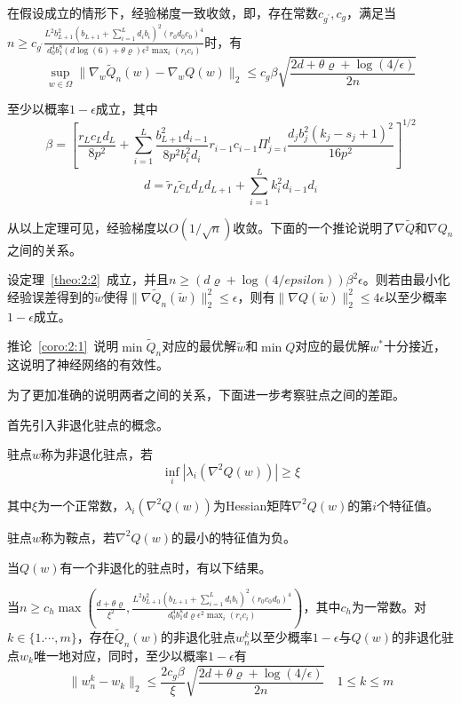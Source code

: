 \begin{theorem}\label{theo:2:2}
在假设成立的情形下，经验梯度一致收敛，即，存在常数$c_{g^\prime}, c_g$，满足当$n \geq c_{g^\prime}\frac{L^2 b_{L+1}^2(b_{L+1}+\sum_{i=1}^Ld_ib_i)^2(r_0d_0c_0)^4}{d_0^4b_1^8(d\log(6)+\theta\varrho)\epsilon^2\max_i(r_ic_i)}$时，有
\[
\sup_{w\in \Omega} \|\nabla_w \tilde{Q}_n(w)-\nabla_wQ(w)\|_2\leq c_g \beta \sqrt{\frac{2d+\theta\varrho+\log(4/\epsilon)}{2n}}
\]
\par
至少以概率$1-\epsilon$成立，其中
\[
\beta = [\frac{r_Lc_Ld_L}{8p^2}+\sum_{i=1}^L\frac{b_{L+1}^2d_{i-1}}{8p^2b_i^2d_i}r_{i-1}c_{i-1}\Pi_{j=i}^l\frac{d_jb_j^2(k_j-s_j+1)^2}{16p^2}]^{1/2}
\]
\[
d = \tilde{r}_L\tilde{c}_L d_Ld_{L+1}+\sum_{i=1}^L k_i^2d_{i-1}d_i
\]
\end{theorem}
\par
从以上定理可见，经验梯度以$O(1/\sqrt{n})$收敛。下面的一个推论说明了$\nabla \tilde{Q}$和$\nabla Q_n$之间的关系。
\begin{corollary}\label{coro:2:1}
设定理~\ref{theo:2:2}~成立，并且$n \geq (d\varrho +\log(4/epsilon))\beta^2\epsilon$。则若由最小化经验误差得到的$\tilde{w}$使得$\|\nabla \tilde{Q}_n(\tilde{w})\|_2^2 \leq \epsilon$，则有$\|\nabla Q(\tilde{w})\|_2^2 \leq 4\epsilon$以至少概率$1-\epsilon$成立。
\end{corollary}
\par
推论~\ref{coro:2:1}~说明$\min \tilde{Q}_n$对应的最优解$\tilde{w}$和$\min Q$对应的最优解$w^*$十分接近，这说明了神经网络的有效性。
\par
为了更加准确的说明两者之间的关系，下面进一步考察驻点之间的差距。
\par
首先引入非退化驻点的概念。
\begin{definition}
驻点$w$称为非退化驻点，若
\[
\inf_i |\lambda_i(\nabla^2 Q(w))| \geq \xi 
\]
\par
其中$\xi$为一个正常数，$\lambda_i(\nabla^2 Q(w))$为Hessian矩阵$\nabla^2 Q(w)$的第$i$个特征值。
\par
驻点$w$称为鞍点，若$\nabla^2 Q(w)$的最小的特征值为负。
\end{definition}
\par
当$Q(w)$有一个非退化的驻点时，有以下结果。
\begin{theorem}\label{theo:2:3}
当$n \geq c_h \max(\frac{d+\theta\varrho}{\xi^2},\frac{L^2b_{L+1}^2(b_{L+1}+\sum_{i=1}^Ld_ib_i)^2(r_0c_0d_0)^4}{d_0^4 b_1^8d\varrho \epsilon^2\max_i(r_ic_i)})$，其中$c_h$为一常数。对$k\in\{1.\cdots,m\}$，存在$\tilde{Q}_n(w)$的非退化驻点$w_n^k$以至少概率$1-\epsilon$与$Q(w)$的非退化驻点$w_k$唯一地对应，同时，至少以概率$1-\epsilon$有
\[
\|w_n^k - w_k\|_2 \leq \frac{2c_g \beta}{\xi}\sqrt{\frac{2d+\theta\varrho+\log(4/\epsilon)}{2n}}\quad 1\leq k \leq m
\]

\end{theorem}

